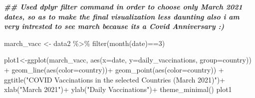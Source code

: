 \documentclass[
]{article}
\newenvironment{Shaded}{\begin{snugshade}}{\end{snugshade}}
\newcommand{\AttributeTok}[1]{\textcolor[rgb]{0.77,0.63,0.00}{#1}}
\newcommand{\CommentTok}[1]{\textcolor[rgb]{0.56,0.35,0.01}{\textit{#1}}}
\newcommand{\DecValTok}[1]{\textcolor[rgb]{0.00,0.00,0.81}{#1}}
\newcommand{\DocumentationTok}[1]{\textcolor[rgb]{0.56,0.35,0.01}{\textbf{\textit{#1}}}}
\newcommand{\FunctionTok}[1]{\textcolor[rgb]{0.00,0.00,0.00}{#1}}
\newcommand{\NormalTok}[1]{#1}
\newcommand{\OtherTok}[1]{\textcolor[rgb]{0.56,0.35,0.01}{#1}}
\newcommand{\SpecialCharTok}[1]{\textcolor[rgb]{0.00,0.00,0.00}{#1}}
\newcommand{\StringTok}[1]{\textcolor[rgb]{0.31,0.60,0.02}{#1}}
\begin{document}
\begin{Shaded}
\end{Shaded}

\begin{Shaded}
\begin{Highlighting}[]
\DocumentationTok{\#\# Used dplyr \textquotesingle{}filter\textquotesingle{} command in order to choose only March 2021 dates, so as to make the final visualization less daunting also i am very intrested to see march because its a Covid Anniversary :)  }

\NormalTok{march\_vacc }\OtherTok{\textless{}{-}}\NormalTok{ data2 }\SpecialCharTok{\%\textgreater{}\%}
  \FunctionTok{filter}\NormalTok{(}\FunctionTok{month}\NormalTok{(date)}\SpecialCharTok{==}\DecValTok{3}\NormalTok{)}
\end{Highlighting}
\end{Shaded}

\begin{Shaded}
\begin{Highlighting}[]
\NormalTok{plot1}\OtherTok{\textless{}{-}}\FunctionTok{ggplot}\NormalTok{(march\_vacc, }\FunctionTok{aes}\NormalTok{(}\AttributeTok{x=}\NormalTok{date, }\AttributeTok{y=}\NormalTok{daily\_vaccinations, }\AttributeTok{group=}\NormalTok{country)) }\SpecialCharTok{+}
  \FunctionTok{geom\_line}\NormalTok{(}\FunctionTok{aes}\NormalTok{(}\AttributeTok{color=}\NormalTok{country))}\SpecialCharTok{+}
  \FunctionTok{geom\_point}\NormalTok{(}\FunctionTok{aes}\NormalTok{(}\AttributeTok{color=}\NormalTok{country)) }\SpecialCharTok{+}
  \FunctionTok{ggtitle}\NormalTok{(}\StringTok{"COVID Vaccinations in the selected Countries (March 2021)"}\NormalTok{)}\SpecialCharTok{+}
  \FunctionTok{xlab}\NormalTok{(}\StringTok{"March 2021"}\NormalTok{)}\SpecialCharTok{+}
  \FunctionTok{ylab}\NormalTok{(}\StringTok{"Daily Vaccinations"}\NormalTok{)}\SpecialCharTok{+}
  \FunctionTok{theme\_minimal}\NormalTok{()}
\NormalTok{plot1}
\end{Highlighting}
\end{Shaded}
\end{document}
